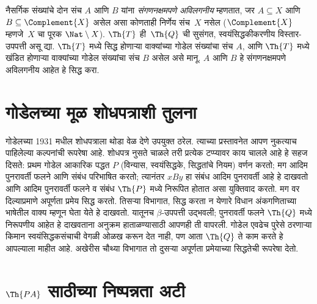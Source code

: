 \begin{prob}
नैसर्गिक संख्यांचे दोन संच
$A$ आणि $B$ यांना
\emph{संगणनक्षमपणे अविलगनीय}
म्हणतात, जर $A \subseteq X$
आणि $B \subseteq \Complement{X}$
असेल असा कोणताही
निर्णेय संच~$X$
नसेल ($\Complement{X}$
म्हणजे~$X$ चा पूरक
$\Nat \setminus X$).
$\Th{T}$ ही~$\Th{Q}$
ची सुसंगत,
स्वयंसिद्धकीकरणीय विस्तार-उपपत्ती
असू द्या. $\Th{T}$
मध्ये सिद्ध होणाऱ्या
वाक्यांच्या गोडेल
संख्यांचा संच $A$,
आणि $\Th{T}$ मध्ये
खंडित होणाऱ्या वाक्यांच्या
गोडेल संख्यांचा संच $B$
असेल असे मानू. $A$ आणि
$B$ हे संगणनक्षमपणे
अविलगनीय आहेत हे सिद्ध करा.
\end{prob}












\section{गोडेलच्या मूळ शोधपत्राशी तुलना}\label{inc:inp:gop:sec}

गोडेलच्या 1931 मधील शोधपत्राला थोडा वेळ
देणे उपयुक्त ठरेल. त्याच्या प्रस्तावनेत आपण
नुकत्याच पाहिलेल्या कल्पनांची रूपरेषा आहे.
शोधपत्र नुसते चाळले तरी प्रत्येक टप्प्यावर
काय चालले आहे हे सहज दिसते: प्रथम गोडेल
आकारिक पद्धत $P$ (विन्यास, स्वयंसिद्धके,
सिद्धतांचे नियम) वर्णन करतो; मग आदिम
पुनरावर्ती फलने आणि संबंध परिभाषित करतो;
त्यानंतर $x B y$ हा संबंध आदिम पुनरावर्ती
आहे हे दाखवतो आणि आदिम पुनरावर्ती फलने
व संबंध $\Th{P}$ मध्ये निरूपित होतात
असा युक्तिवाद करतो. मग वर दिल्याप्रमाणे
अपूर्णता प्रमेय सिद्ध करतो. तिसऱ्या विभागात,
सिद्ध करता न येणारे विधान अंकगणिताच्या
भाषेतील वाक्य म्हणून घेता येते हे दाखवतो.
यातूनच $\beta$-उपपत्ती उद्भवली; पुनरावर्ती
फलने $\Th{Q}$ मध्ये निरूपणीय आहेत हे
दाखवताना अनुक्रम हाताळण्यासाठी आपणही ती
वापरली. गोडेल एवढेच पुरेसे ठरणाऱ्या
किमान स्वयंसिद्धकसंचाची वेगळी ओळख करून
देत नाही, पण आता $\Th{Q}$ ते काम करते
हे आपल्याला माहीत आहे. अखेरीस चौथ्या
विभागात तो दुसऱ्या अपूर्णता प्रमेयाच्या
सिद्धतेची रूपरेषा देतो.












\section[PA साठीच्या निष्पन्नता अटी]{$\Th{PA}$ साठीच्या निष्पन्नता अटी}\label{inc:inp:prc:sec}

